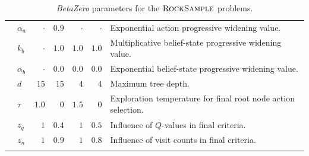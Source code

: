 \begin{table}[t!]
\begin{adjustbox}{max width=\textwidth}
\begin{threeparttable}
\begin{footnotesize}
\begin{tabular}{@{}clrrrrm{9cm}@{}}
              & $\alpha_a$ & $\cdot$ & $\num{0.9}$ & $\cdot$ & $\cdot$ & Exponential action progressive widening value.\\
              & $k_b$ & $\cdot$ & $\num{1.0}$ & $\num{1.0}$ & $\num{1.0}$ & Multiplicative belief-state progressive widening value.\\
              & $\alpha_b$ & $\cdot$ & $\num{0.0}$ & $\num{0.0}$ & $\num{0.0}$ & Exponential belief-state progressive widening value.\\
              & $d$ & $\num{15}$ & $\num{15}$ & $\num{4}$ & $\num{4}$ & Maximum tree depth. \\
              & $\tau$ & $\num{1.0}$ & $\num{0}$ & $\num{1.5}$ & $\num{0}$ & Exploration temperature for final root node action selection. \\
              & $z_q$ & $\num{1}$ & $\num{0.4}$ & $\num{1}$ & $\num{0.5}$ & Influence of $Q$-values in final criteria. \\
              & $z_n$ & $\num{1}$ & $\num{0.9}$ & $\num{1}$ & $\num{0.8}$ & Influence of visit counts in final criteria. \\
            \arrayrulecolor{black} %
            \bottomrule
        \end{tabular}
        \end{footnotesize}
    \end{threeparttable}
    \end{adjustbox}
    \caption{\textit{BetaZero} parameters for the $\textsc{RockSample}$ problems.}\label{tab:rs_params}
\end{table}


